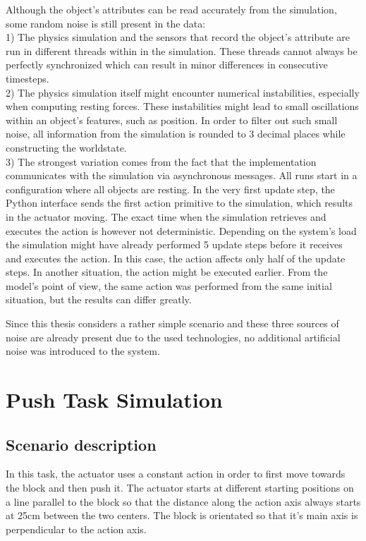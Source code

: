 Although the object's attributes can be read accurately from the simulation, some random noise is still present in the data: \\
1) The physics simulation and the sensors that record the object's attribute are run in different threads within
in the simulation. These threads cannot always be perfectly synchronized which can result in minor differences in consecutive 
timesteps. \\
2) The physics simulation itself might encounter numerical instabilities, especially when computing resting forces. These instabilities
might lead to small oscillations within an object's features, such as position. In order to filter out such small noise, all
information from the simulation is rounded to 3 decimal places while constructing the worldstate. \\
3) The strongest variation comes from the fact that the implementation communicates with the simulation via asynchronous messages. 
All runs start in a configuration where all objects are resting. In the very first update step, the Python interface sends the first
action primitive to the simulation, which results in the actuator moving. The exact time when the simulation retrieves and executes
the action is however not deterministic. Depending on the system's load the simulation might have already performed 5 update steps before
it receives and executes the action. In this case, the action affects only half of the update steps. In another situation, the action might
be executed earlier. From the model's point of view, the same action was performed from the same initial situation, but the results can
differ greatly. 

Since this thesis considers a rather simple scenario and these three sources of noise are already present due to the used technologies,
no additional artificial noise was introduced to the system.

\section{Push Task Simulation \label{sec:pushTaskSim}}


\subsection{Scenario description}

In this task, the actuator uses a constant action in order to first move towards the block and then push it.
The actuator starts at different starting positions on a line parallel to the block so that the distance along
the action axis always starts at 25cm between the two centers. The block is orientated so that it's main axis
is perpendicular to the action axis.

